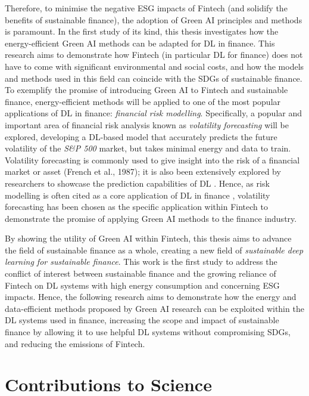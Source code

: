 \documentclass[a4paper, 11pt]{report}
\begin{document}
    Therefore, to minimise the negative ESG impacts of Fintech (and solidify the benefits of sustainable finance), the adoption of Green AI principles and methods is paramount. In the first study of its kind, this thesis investigates how the energy-efficient Green AI methods can be adapted for DL in finance. This research aims to demonstrate how Fintech (in particular DL for finance) does not have to come with significant environmental and social costs, and how the models and methods used in this field can coincide with the SDGs of sustainable finance. To exemplify the promise of introducing Green AI to Fintech and sustainable finance, energy-efficient methods will be applied to one of the most popular applications of DL in finance: \emph{financial risk modelling}. Specifically, a popular and important area of financial risk analysis known as \emph{volatility forecasting} will be explored, developing a DL-based model that accurately predicts the future volatility of the \emph{S\&P 500} market, but takes minimal energy and data to train. Volatility forecasting is commonly used to give insight into the risk of a financial market or asset (French et al., 1987); it is also been extensively explored by researchers to showcase the prediction capabilities of DL \citep{zhang-2022}. Hence, as risk modelling is often cited as a core application of DL in finance \citep{thakkar-2021}, volatility forecasting has been chosen as the specific application within Fintech to demonstrate the promise of applying Green AI methods to the finance industry.

    By showing the utility of Green AI within Fintech, this thesis aims to advance the field of sustainable finance as a whole, creating a new field of \emph{sustainable deep learning for sustainable finance}. This work is the first study to address the conflict of interest between sustainable finance and the growing reliance of Fintech on DL systems with high energy consumption and concerning ESG impacts. Hence, the following research aims to demonstrate how the energy and data-efficient methods proposed by Green AI research can be exploited within the DL systems used in finance, increasing the scope and impact of sustainable finance by allowing it to use helpful DL systems without compromising SDGs, and reducing the emissions of Fintech.


    \section{Contributions to Science}
    \label{section: contributions}
\end{document}
